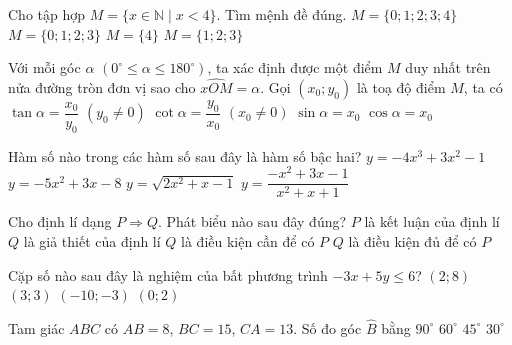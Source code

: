 	\begin{ex}%
		Cho tập hợp $M=\big\{x \in \mathbb{N} \mid x < 4\big\}$. Tìm mệnh đề đúng.
		\choice
		{$M=\big\{0;1;2;3;4\big\}$}
		{\True $M=\big\{0;1;2;3\big\}$}
		{$M=\big\{4\big\}$}
		{$M=\big\{1;2;3\big\}$}
	\end{ex}
	\begin{ex}%
		Với mỗi góc $\alpha$ $\left(0^{\circ} \leq \alpha \leq 
		180^{\circ}\right)$, ta xác định được một điểm $M$ duy nhất trên nửa 
		đường tròn đơn vị sao cho $\widehat{xOM}=\alpha$. Gọi $(x_0;y_0)$ là 
		toạ độ điểm $M$, ta có
		\choice
		{$\tan\alpha=\dfrac{x_0}{y_0}$ $\left(y_0 \neq 0\right)$}
		{$\cot\alpha=\dfrac{y_0}{x_0}$ $\left(x_0 \neq 0\right)$}
		{$\sin\alpha=x_0$}
		{\True $\cos\alpha=x_0$}
	\end{ex}
	\begin{ex}%
		Hàm số nào trong các hàm số sau đây là hàm số bậc hai?
		\choice
		{$y=-4x^3+3x^2-1$}
		{\True $y=-5x^2+3x-8$}
		{$y=\sqrt{2x^2+x-1}$}
		{$y=\dfrac{-x^2+3x-1}{x^2+x+1}$}
	\end{ex}
	\begin{ex}%
		Cho định lí dạng $P \Rightarrow Q$. Phát biểu nào sau đây đúng?
		\choice
		{$P$ là kết luận của định lí}
		{$Q$ là giả thiết của định lí}
		{\True $Q$ là điều kiện cần để có $P$}
		{$Q$ là điều kiện đủ để có $P$}
	\end{ex}
	\begin{ex}%
		Cặp số nào sau đây là nghiệm của bất phương trình $-3x+5y \leq 6$?
		\choice
		{$(2;8)$}
		{\True $(3;3)$}
		{$(-10;-3)$}
		{$(0;2)$}
	\end{ex}
	\begin{ex}%
		Tam giác $ABC$ có $AB=8$, $BC=15$, $CA=13$. Số đo góc $\widehat{B}$ bằng
		\choice
		{$90^{\circ}$}
		{\True $60^{\circ}$}
		{$45^{\circ}$}
		{$30^{\circ}$}
	\end{ex}

